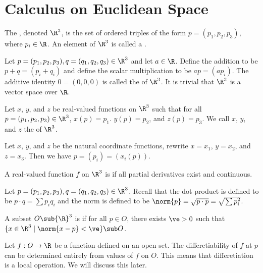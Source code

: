 \documentclass[10pt]{article}
\begin{document}
\hsetup
\htoc
\hmain
\par
\section{Calculus on Euclidean Space}
\begin{definition}
    The , denoted ${\R}^{3}$, is the set of ordered triples of the form $p=({p}_{1},{p}_{2},{p}_{3})$, where ${p}_{i}\in\R$. An element of ${\R}^{3}$ is called a .
\end{definition}
\par
Let $p=({p}_{1},{p}_{2},{p}_{3}),q=({q}_{1},{q}_{2},{q}_{3})\in{\R}^{3}$ and let $a\in\R$. Define the addition to be $p+q=({p}_{i}+{q}_{i})$ and define the scalar multiplication to be $ap=(a{p}_{i})$. The additive identity $0=(0,0,0)$ is called the  of ${\R}^{3}$. It is trivial that ${\R}^{3}$ is a vector space over $\R$.
\begin{definition}
    Let $x$, $y$, and $z$ be real-valued functions on ${\R}^{3}$ such that for all $p=({p}_{1},{p}_{2},{p}_{3})\in{\R}^{3}$, $x(p)={p}_{1}$. $y(p)={p}_{2}$, and $z(p)={p}_{3}$. We call $x$, $y$, and $z$ the  of ${\R}^{3}$.
\end{definition}
\par
Let $x$, $y$, and $z$ be the natural coordinate functions, rewrite $x={x}_{1}$, $y={x}_{2}$, and $z={x}_{3}$. Then we have $p=({p}_{i})=({x}_{i}(p))$.
\begin{definition}
    A real-valued function $f$ on ${\R}^{3}$ is  if all partial derivatives exist and continuous.
\end{definition}
\par
Let $p=({p}_{1},{p}_{2},{p}_{3}),q=({q}_{1},{q}_{2},{q}_{3})\in{\R}^{3}$. Recall that the dot product is defined to be $p\cdot q=\sum{p}_{i}{q}_{i}$ and the norm is defined to be $\norm{p}=\sqrt{p\cdot p}=\sqrt{\sum{p}_{i}^{2}}$. 
\begin{definition}
    A subset $O\sub{\R}^{3}$ is  if for all $p\in O$, there exists $\ve>0$ such that $\{x\in{\R}^{3}\mid\norm{x-p}<\ve\}\sub O$. 
\end{definition}
\par
Let $f:O\to\R$ be a function defined on an open set. The differetiability of $f$ at $p$ can be determined entirely from values of $f$ on $O$. This means that differetiation is a local operation. We will discuss this later.
\end{document}
